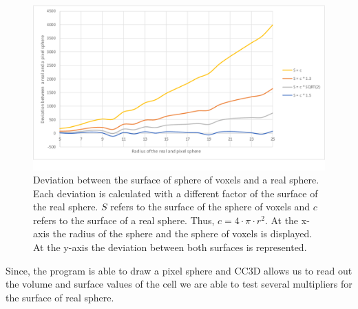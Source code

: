 \begin{figure}
	\center
	\includegraphics[scale=0.3]{figures/DeviationSphereToPixelSphere.png}
	\caption{Deviation between the surface of sphere of voxels and a real sphere. Each deviation is calculated with a different factor of the surface of the real sphere. $S$ refers to the surface of the sphere of voxels and $c$ refers to the surface of a real sphere. Thus, $c = 4 \cdot \pi \cdot r^{2}$. \newline
	At the x-axis the radius of the sphere and the sphere of voxels is displayed. At the y-axis the deviation between both surfaces is represented.}
	\label{img:DeviationSphere}
\end{figure}

\newpage
Since, the program is able to draw a pixel sphere and \ac{CC3D} allows us to read out the volume and surface values of the cell we are able to test several multipliers for the surface of real sphere.

